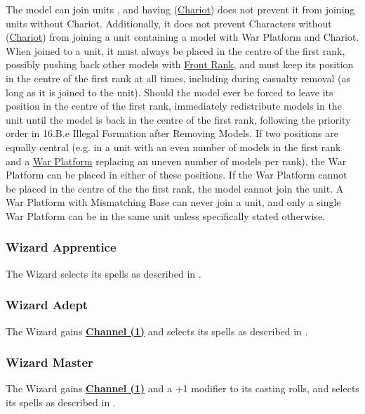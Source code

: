 The model can join units , and having \exclusive{} (\hyperref[chariot]{Chariot}) does not prevent it from joining units without Chariot. Additionally, it does not prevent Characters without \exclusive{} (\hyperref[chariot]{Chariot}) from joining a unit containing a model with War Platform and Chariot. When joined to a unit, it must always be placed in the centre of the first rank, possibly pushing back other models with \hyperref[front_rank]{Front Rank}, and must keep its position in the centre of the first rank at all times, including during casualty removal (as long as it is joined to the unit). Should the model ever be forced to leave its position in the centre of the first rank, immediately redistribute models in the unit until the model is back in the centre of the first rank, following the priority order in 16.B.e Illegal Formation after Removing Models. If two positions are equally central (e.g. in a unit with an even number of models in the first rank and a \hyperref[war_platform]{War Platform} replacing an uneven number of models per rank), the War Platform can be placed in either of these positions. If the War Platform cannot be placed in the centre of the the first rank, the model cannot join the unit. A War Platform with Mismatching Base can never join a unit, and only a single War Platform can be in the same unit unless specifically stated otherwise.

\subsubsection{Wizard Apprentice}
\idx[main=y]{\wizardapprentice}\label{wizard_apprentice}

The Wizard selects its spells as described in .

\subsubsection{Wizard Adept}
\idx[main=y]{\wizardadept}\label{wizard_adept}

The Wizard gains \textbf{\hyperref[channel]{Channel (1)}} and selects its spells as described in .

\subsubsection{Wizard Master}
\idx[main=y]{\wizardmaster}\label{wizard_master}

The Wizard gains \textbf{\hyperref[channel]{Channel (1)}} and a +1 modifier to its casting rolls, and selects its spells as described in .

